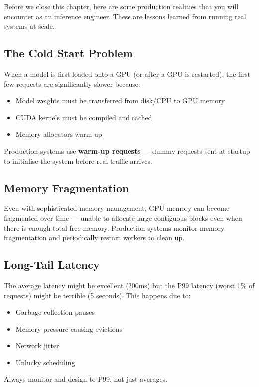 \documentclass[12pt, twoside, openright]{book}
\newcommand{\term}[1]{\textbf{\color{chaptercolor}#1}}
\begin{document}
Before we close this chapter, here are some production realities
that you will encounter as an inference engineer.
These are lessons learned from running real systems at scale.

\subsection{The Cold Start Problem}

When a model is first loaded onto a GPU (or after a GPU is restarted),
the first few requests are significantly slower because:
\begin{itemize}
  \item Model weights must be transferred from disk/CPU to GPU memory
  \item CUDA kernels must be compiled and cached
  \item Memory allocators warm up
\end{itemize}

Production systems use \term{warm-up requests} --- dummy requests sent
at startup to initialise the system before real traffic arrives.

\subsection{Memory Fragmentation}

Even with sophisticated memory management, GPU memory can become
fragmented over time --- unable to allocate large contiguous blocks
even when there is enough total free memory.
Production systems monitor memory fragmentation and periodically
restart workers to clean up.

\subsection{Long-Tail Latency}

The average latency might be excellent (200ms) but the P99 latency
(worst 1\% of requests) might be terrible (5 seconds).
This happens due to:
\begin{itemize}
  \item Garbage collection pauses
  \item Memory pressure causing evictions
  \item Network jitter
  \item Unlucky scheduling
\end{itemize}

Always monitor and design to P99, not just averages.
\end{document}
